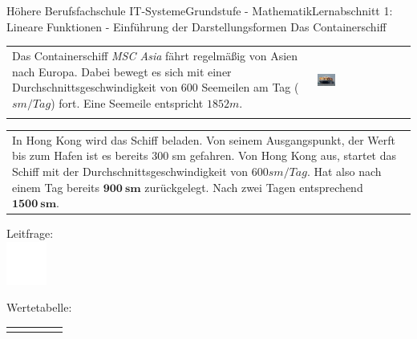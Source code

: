 \documentclass[oneside,openany,headings=optiontotoc,11pt,numbers=noenddot]{scrreprt}
\begin{document}
	\begin{worksheet}{Höhere Berufsfachschule IT-Systeme}{Grundstufe - Mathematik}{Lernabschnitt 1: Lineare Funktionen - Einführung der Darstellungsformen}
		\noindent
		\LARGE Das Containerschiff\\
		\normalsize
		\noindent
		\begin{tabularx}{\textwidth}{Xl}
			Das Containerschiff \textit{MSC Asia} fährt regelmäßig von Asien nach Europa. Dabei bewegt es sich mit einer Durchschnittsgeschwindigkeit von \(600\) Seemeilen am Tag (\(sm/Tag\)) fort. Eine Seemeile entspricht \(1852 m\). & \multirow{2}{*}{\includegraphics[width=0.2\textwidth,align=c]{../99_Bilder/cont.jpg}}\\
			\\
		\end{tabularx}
		\par\noindent
		\begin{tabularx}{\textwidth}{X}
			In Hong Kong wird das Schiff beladen. Von seinem Ausgangspunkt, der Werft bis zum Hafen ist es bereits 300 sm gefahren. Von Hong Kong aus, startet das Schiff mit der Durchschnittsgeschwindigkeit von \(600 sm/Tag\). Hat also nach einem Tag bereits \(\mathbf{900\ sm}\) zurückgelegt. Nach zwei Tagen entsprechend \(\mathbf{1500\ sm}\).\\
		\end{tabularx}
		\begin{framed}
			\noindent
			\small{\color{codegray}Leitfrage:}\\
			\includegraphics[width=0.1\textwidth]{../../empty.jpg}\\
		\end{framed}
		\begin{framed}
			\noindent
			\small{\color{codegray}Wertetabelle:}\\
			\begin{tabularx}{\textwidth}{M|M|M|M|M}
				& & & & \\
				\hline
				& & & &
			\end{tabularx}\\
			\par\noindent

\end{framed}
\end{worksheet}
\end{document}
